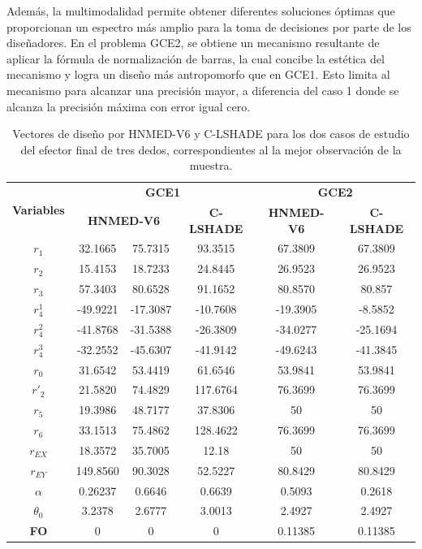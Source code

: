  Además, la multimodalidad permite obtener diferentes soluciones óptimas que proporcionan un espectro más amplio para la toma de decisiones por parte de los diseñadores. En el problema GCE2, se obtiene un mecanismo resultante de aplicar la fórmula de normalización de barras, la cual concibe la estética del mecanismo y logra un diseño más antropomorfo que en GCE1. Esto limita al mecanismo para alcanzar una precisión mayor, a diferencia del caso 1 donde se alcanza la precisión máxima con error igual cero.
\begin{table}
	\centering
	\caption{Vectores de diseño por HNMED-V6 y C-LSHADE para los dos casos de estudio del efector final de tres dedos, correspondientes al la mejor observación de la muestra.} \label{Vectores de diseño por HNMED-V6 y C-LSHADE para los dos casos de estudio del efector final de tres dedos, correspondientes al la mejor observación de la muestra.}
	\begin{tabular}{|c|c|c|c|c|c|} 
		\hline
			\multirow{2}{*}{\textbf{Variables}} & \multicolumn{3}{c|}{\textbf{GCE1}} & \multicolumn{2}{c|}{\textbf{GCE2}}   \\ 
		\cline{2-6}
	                &\multicolumn{2}{c|}{\textbf{HNMED-V6}}&\textbf{ C-LSHADE   }&\textbf{ HNMED-V6    } & \textbf{C-LSHADE     }\\ 
		\hline
		$r_1$        & 32.1665 &75.7315 &93.3515    & 67.3809  & 67.3809      \\ 
		\hline
		$r_2$        & 15.4153  &18.7233& 24.8445    & 26.9523  & 26.9523      \\ 
		\hline
		$r_3$        & 57.3403  &80.6528 &91.1652    & 80.8570  & 80.857       \\ 
		\hline
		$r^1_4$       & -49.9221&-17.3087&-10.7608   & -19.3905 & -8.5852      \\ 
		\hline
		$r^2_4$       & -41.8768  &-31.5388& -26.3809   & -34.0277 & -25.1694     \\ 
		\hline
		$r^3_4$       & -32.2552 &-45.6307 &-41.9142   & -49.6243 & -41.3845     \\ 
		\hline
		$r_0$        & 31.6542  &53.4419&61.6546    & 53.9841  & 53.9841      \\ 
		\hline
		$r'_2$       & 21.5820  &74.4829&117.6764   & 76.3699   & 76.3699      \\ 
		\hline
		$r_5$        & 19.3986  &48.7177 &37.8306    & 50           & 50           \\ 
		\hline
		$r_6$        & 33.1513  &75.4862&128.4622   & 76.3699   & 76.3699      \\ 
		\hline
		$r_{EX}$       & 18.3572  &35.7005& 12.18      & 50           & 50           \\ 
		\hline
		$r_{EY}$       & 149.8560  &90.3028& 52.5227    & 80.8429  & 80.8429      \\ 
		\hline
		$\alpha$     & 0.26237  &0.6646& 0.6639     & 0.5093  & 0.2618       \\ 
		\hline
		$\theta_0$    & 3.2378  &2.6777 &3.0013     & 2.4927  & 2.4927       \\ 
		\hline
	\textbf{	FO   }     & 0     &0       & 0          & 0.11385  & 0.11385  \\
		\hline
	\end{tabular}
\end{table}

